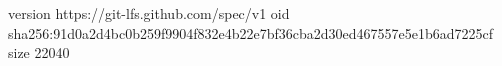 version https://git-lfs.github.com/spec/v1
oid sha256:91d0a2d4bc0b259f9904f832e4b22e7bf36cba2d30ed467557e5e1b6ad7225cf
size 22040
